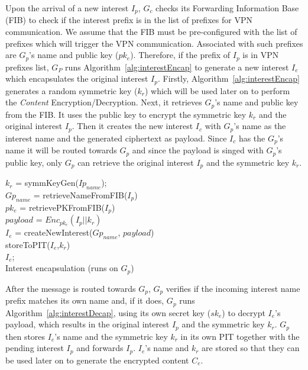 \documentclass[conference,letterpaper,10pt]{IEEEtran}
\begin{document}
Upon the arrival of a new interest $I_p$, $G_c$ checks its Forwarding Information Base (FIB) to check if the interest prefix is in the list of prefixes for VPN communication. We assume that the FIB must be pre-configured with the list of prefixes which will trigger the VPN communication. Associated with such prefixes are $G_p$'s name and public key ($pk_e$). Therefore, if the prefix of $I_p$ is in VPN prefixes list, $G_P$ runs Algorithm~\ref{alg:interestEncap} to generate a new interest $I_e$ which encapsulates the original interest $I_p$. Firstly, Algorithm~\ref{alg:interestEncap} generates a random symmetric key ($k_r$) which will be used later on to perform the \textit{Content} Encryption/Decryption. Next, it retrieves $G_p$'s name and public key from the FIB. It uses the public key to encrypt the symmetric key $k_r$ and the original interest $I_p$. Then it creates the new interest $I_c$ with $G_p$'s name as the interest name and the generated  ciphertext as payload. Since $I_c$ has  the $G_p$'s name it will be routed towards $G_p$ and since the payload is singed with $G_p$'s public key, only $G_p$ can retrieve the original interest $I_p$ and the symmetric key $k_r$.

\begin{algorithm}[]\label{alg:interestEncap}
$k_r$ = symmKeyGen($Ip_{name}$);\\
$Gp_{name}$ = retrieveNameFromFIB($I_p$)\\
$pk_e$ = retrievePKFromFIB($I_p$)\\
$payload$ = $Enc_{pk_e}(I_p||k_r)$\\
$I_e$ = createNewInterest($Gp_{name}$, $payload$)\\
storeToPIT($I_e$,$k_r$)\\
\Return $I_e$;\\
\caption{Interest encapsulation (runs on $G_p$)}
\end{algorithm}

After the message is routed towards $G_p$, $G_p$ verifies if the incoming interest name prefix matches its own name and, if it does, $G_p$ runs Algorithm~\ref{alg:interestDecap}, using its own secret key ($sk_e$) to decrypt $I_e$'s payload, which results in the original interest $I_p$ and the symmetric key $k_r$. $G_p$ then stores $I_e$'s name and the symmetric key $k_r$ in its own PIT together with the pending interest $I_p$ and forwards $I_p$. $I_e$'s name and $k_r$ are stored so that they can be used later on to generate the encrypted content $C_e$.
\end{document}
